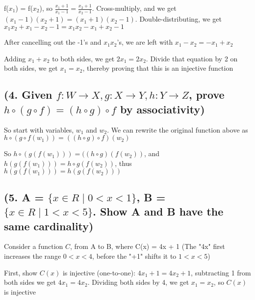 \documentclass{article}
\begin{document}
\noindent f($x_{1}$) = f($x_{2}$), so $\frac{x_{1} + 1}{x_{1} - 1} = \frac{x_{2} + 1}{x_{2} - 1}$.  Cross-multiply, and we get  $(x_{1} - 1)(x_{2} + 1) = (x_{1} + 1)(x_{2} - 1)$.  Double-distributing, we get  $x_{1}x_{2} + x_{1} - x_{2} - 1 = x_{1}x_{2} - x_{1} + x_{2} - 1$ \par\vspace{0.5cm}

\noindent After cancelling out the -1's and $x_{1}x_{2}$'s, we are left with $x_{1} - x_{2} = -x_{1} + x_{2}$ \par\noindent
Adding $x_{1} + x_{2}$ to both sides, we get $2x_{1} = 2x_{2}$.  Divide that equation by 2 on both sides, we get $x_{1} = x_{2}$, thereby proving that this is an injective function

\subsection{(4. Given $f: W \rightarrow X, g: X \rightarrow Y, h: Y \rightarrow Z$, prove $h \circ (g \circ f) = (h \circ g) \circ f$ by associativity)}

\noindent So start with variables, $w_{1}$ and $w_{2}$.  We can rewrite the original function above as $h \circ (g \circ f (w_{1})) = ((h \circ g) \circ f) (w_{2})$ \par\vspace{0.5cm}

\noindent So $h \circ (g(f(w_{1}))) = ((h \circ g)(f(w_{2}))$, and $h(g(f(w_{1}))) = h \circ g(f(w_{2}))$, thus $h(g(f(w_{1}))) = h(g(f(w_{2})))$

\subsection{(5. A = $\{x \in R \mid 0 < x < 1\}$, B = $\{x \in R \mid 1 < x < 5\}$.  Show A and B have the same cardinality)}

Consider a function $C$, from A to B, where C(x) = 4x + 1 (The "4x" first increases the range $0 < x < 4$, before the "+1" shifts it to $1 < x < 5$) \par\vspace{0.5cm}

\noindent First, show $C(x)$ is injective (one-to-one): $4x_{1} + 1 = 4x_{2} + 1$, subtracting 1 from both sides we get $4x_{1} = 4x_{2}$.  Dividing both sides by 4, we get $x_{1} = x_{2}$, so $C(x)$ is injective \par\vspace{0.5cm}
\end{document}
